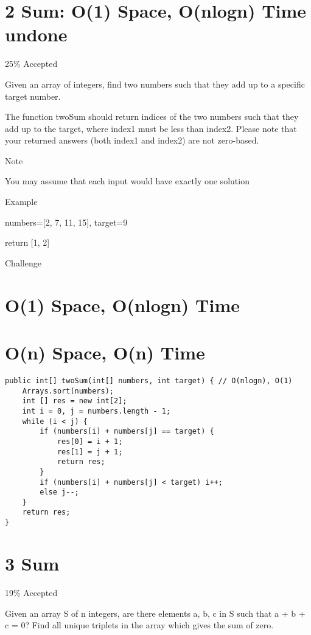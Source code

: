 \documentclass[9pt, b5paaper]{book}
\begin{document}
\section{2 Sum: O(1) Space, O(nlogn) Time undone}
\label{sec-1-2}

25\% Accepted

Given an array of integers, find two numbers such that they add up to a specific target number.

The function twoSum should return indices of the two numbers such that they add up to the target, where index1 must be less than index2. Please note that your returned answers (both index1 and index2) are not zero-based.

Note

You may assume that each input would have exactly one solution

Example

numbers=[2, 7, 11, 15], target=9

return [1, 2]

Challenge

\section{O(1) Space, O(nlogn) Time}
\label{sec-1-3}

\section{O(n) Space, O(n) Time}
\label{sec-1-4}
\begin{verbatim}
public int[] twoSum(int[] numbers, int target) { // O(nlogn), O(1)
    Arrays.sort(numbers);
    int [] res = new int[2];
    int i = 0, j = numbers.length - 1;
    while (i < j) {
        if (numbers[i] + numbers[j] == target) {
            res[0] = i + 1;
            res[1] = j + 1;
            return res;
        }
        if (numbers[i] + numbers[j] < target) i++;
        else j--;
    }
    return res;
}
\end{verbatim}

\section{3 Sum}
\label{sec-1-5}

19\% Accepted

Given an array S of n integers, are there elements a, b, c in S such that a + b + c = 0? Find all unique triplets in the array which gives the sum of zero.
\end{document}
